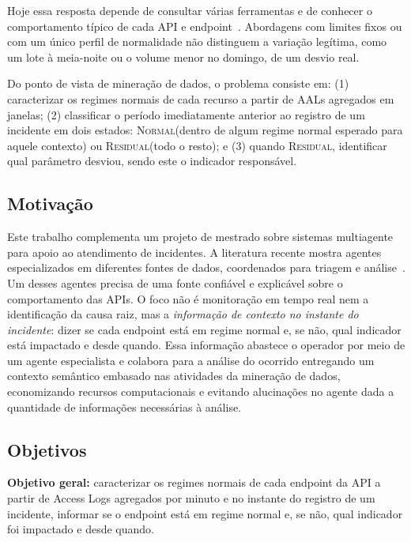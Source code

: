 \documentclass[sigconf,nonacm]{acmart}
\newcommand{\Normal}{\textsc{Normal}\xspace}
\newcommand{\Residual}{\textsc{Residual}\xspace}
\begin{document}
Hoje essa resposta depende de consultar várias ferramentas e de conhecer o comportamento típico de cada API e endpoint~\citep{zhang2025isre}. Abordagens com limites fixos ou com um único perfil de normalidade não distinguem a variação legítima, como um lote à meia-noite ou o volume menor no domingo, de um desvio real.

Do ponto de vista de mineração de dados, o problema consiste em: (1) caracterizar os regimes normais de cada recurso a partir de AALs agregados em janelas; (2) classificar o período imediatamente anterior ao registro de um incidente em dois estados: \Normal (dentro de algum regime normal esperado para aquele contexto) ou \Residual (todo o resto); e (3) quando \Residual, identificar qual parâmetro desviou, sendo este o indicador responsável.


\subsection{Motivação}
Este trabalho complementa um projeto de mestrado sobre sistemas multiagente para apoio ao atendimento de incidentes. A literatura recente mostra agentes especializados em diferentes fontes de dados, coordenados para triagem e análise~\citep{yu2025triangle,luo2025opsagent,zhang2025isre}. Um desses agentes precisa de uma fonte confiável e explicável sobre o comportamento das APIs. O foco não é monitoração em tempo real nem a identificação da causa raiz, mas a \emph{informação de contexto no instante do incidente}: dizer se cada endpoint está em regime normal e, se não, qual indicador está impactado e desde quando. Essa informação abastece o operador por meio de um agente especialista e colabora para a análise do ocorrido entregando um contexto semântico embasado nas atividades da mineração de dados, economizando recursos computacionais e evitando alucinações no agente dada a quantidade de informações necessárias à análise.

\subsection{Objetivos}
\textbf{Objetivo geral:} caracterizar os regimes normais de cada endpoint da API a partir de Access Logs agregados por minuto e no instante do registro de um incidente, informar se o endpoint está em regime normal e, se não, qual indicador foi impactado e desde quando.
\end{document}
